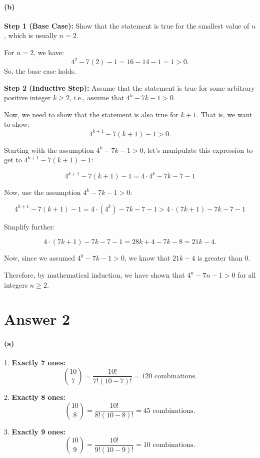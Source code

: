 \documentclass[12pt]{article}
\begin{document}
\paragraph{(b)}

\textbf{Step 1 (Base Case):}
Show that the statement is true for the smallest value of \(n\), which is usually \(n = 2\).

For \(n = 2\), we have:
\[4^2 - 7(2) - 1 = 16 - 14 - 1 = 1 > 0.\]
So, the base case holds.

\textbf{Step 2 (Inductive Step):}
Assume that the statement is true for some arbitrary positive integer \(k \geq 2\), i.e., assume that \(4^k - 7k - 1 > 0\).

Now, we need to show that the statement is also true for \(k + 1\). That is, we want to show:
\[4^{k+1} - 7(k+1) - 1 > 0.\]

Starting with the assumption \(4^k - 7k - 1 > 0\), let's manipulate this expression to get to \(4^{k+1} - 7(k+1) - 1\):

\[4^{k+1} - 7(k+1) - 1 = 4 \cdot 4^k - 7k - 7 - 1\]

Now, use the assumption \(4^k - 7k - 1 > 0\):

\[4^{k+1} - 7(k+1) - 1 = 4 \cdot (4^k) - 7k - 7 - 1 > 4 \cdot (7k + 1) - 7k - 7 - 1\]

Simplify further:

\[4 \cdot (7k + 1) - 7k - 7 - 1 = 28k + 4 - 7k - 8 = 21k - 4.\]

Now, since we assumed \(4^k - 7k - 1 > 0\), we know that \(21k - 4\) is greater than 0.

Therefore, by mathematical induction, we have shown that \(4^n - 7n - 1 > 0\) for all integers \(n \geq 2\).


\section*{Answer 2}
\paragraph{(a)}

1. \textbf{Exactly 7 ones:}
   \[
   \binom{10}{7} = \frac{10!}{7!(10-7)!} = 120 \text{ combinations.}
   \]

2. \textbf{Exactly 8 ones:}
   \[
   \binom{10}{8} = \frac{10!}{8!(10-8)!} = 45 \text{ combinations.}
   \]

3. \textbf{Exactly 9 ones:}
   \[
   \binom{10}{9} = \frac{10!}{9!(10-9)!} = 10 \text{ combinations.}
   \]
\end{document}
